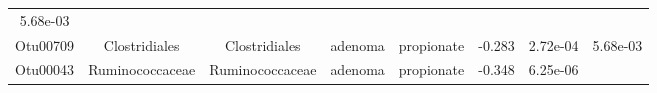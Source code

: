 \documentclass[11pt,]{article}
\begin{document}
\begin{longtable}[]{@{}cccccccc@{}}
\begin{minipage}[t]{0.08\columnwidth}
5.68e-03\strut
\end{minipage}\tabularnewline
\begin{minipage}[t]{0.08\columnwidth}\centering\strut
Otu00709\strut
\end{minipage} & \begin{minipage}[t]{0.15\columnwidth}\centering\strut
Clostridiales\strut
\end{minipage} & \begin{minipage}[t]{0.15\columnwidth}\centering\strut
Clostridiales\strut
\end{minipage} & \begin{minipage}[t]{0.08\columnwidth}\centering\strut
adenoma\strut
\end{minipage} & \begin{minipage}[t]{0.09\columnwidth}\centering\strut
propionate\strut
\end{minipage} & \begin{minipage}[t]{0.07\columnwidth}\centering\strut
-0.283\strut
\end{minipage} & \begin{minipage}[t]{0.08\columnwidth}\centering\strut
2.72e-04\strut
\end{minipage} & \begin{minipage}[t]{0.08\columnwidth}\centering\strut
5.68e-03\strut
\end{minipage}\tabularnewline
\begin{minipage}[t]{0.08\columnwidth}\centering\strut
Otu00043\strut
\end{minipage} & \begin{minipage}[t]{0.15\columnwidth}\centering\strut
Ruminococcaceae\strut
\end{minipage} & \begin{minipage}[t]{0.15\columnwidth}\centering\strut
Ruminococcaceae\strut
\end{minipage} & \begin{minipage}[t]{0.08\columnwidth}\centering\strut
adenoma\strut
\end{minipage} & \begin{minipage}[t]{0.09\columnwidth}\centering\strut
propionate\strut
\end{minipage} & \begin{minipage}[t]{0.07\columnwidth}\centering\strut
-0.348\strut
\end{minipage} & \begin{minipage}[t]{0.08\columnwidth}\centering\strut
6.25e-06\strut
\end{minipage} & \begin{minipage}[t]{0.08\columnwidth}\centering\strut

\end{minipage}
\end{longtable}
\end{document}
